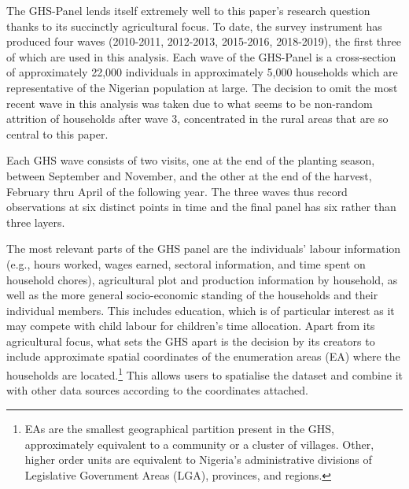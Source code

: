 \documentclass[a4paper,12pt]{article}
\theoremstyle{plain}
\theoremstyle{definition}
\theoremstyle{definition}
\theoremstyle{definition}
\theoremstyle{definition}
\begin{document}
The GHS-Panel lends itself extremely well to this paper's research question thanks to its succinctly agricultural focus. To date, the survey instrument has produced four waves (2010-2011, 2012-2013, 2015-2016, 2018-2019), the first three of which are used in this analysis. Each wave of the GHS-Panel is a cross-section of approximately 22,000 individuals in approximately 5,000 households which are representative of the Nigerian population at large. The decision to omit the most recent wave in this analysis was taken due to what seems to be non-random attrition of households after wave 3, concentrated in the rural areas that are so central to this paper.

Each GHS wave consists of two visits, one at the end of the planting season, between September and November, and the other at the end of the harvest, February thru April of the following year. The three waves thus record observations at six distinct points in time and the final panel has six rather than three layers.

The most relevant parts of the GHS panel are the individuals' labour information (e.g., hours worked, wages earned, sectoral information, and time spent on household chores), agricultural plot and production information by household, as well as the more general socio-economic standing of the households and their individual members. This includes education, which is of particular interest as it may compete with child labour for children's time allocation. Apart from its agricultural focus, what sets the GHS apart is the decision by its creators to include approximate spatial coordinates of the enumeration areas (EA) where the households are located.\footnote{EAs are the smallest geographical partition present in the GHS, approximately equivalent to a community or a cluster of villages. Other, higher order units are equivalent to Nigeria's administrative divisions of Legislative Government Areas (LGA), provinces, and regions.} This allows users to spatialise the dataset and combine it with other data sources according to the coordinates attached.
\end{document}
